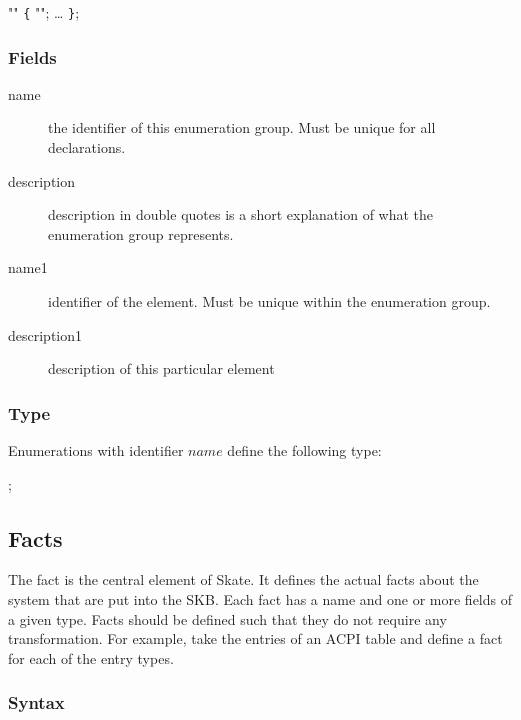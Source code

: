 \documentclass[a4paper,11pt,twoside]{report}
\begin{document}
{{\begin{syntax}
  "" \verb+{+
     "";
    \ldots
\verb+}+;
\end{syntax}

\subsubsection{Fields}

\begin{description}
    \item[name] the identifier of this enumeration group. Must be unique for 
                all declarations.
    
    \item [description] description in double quotes is a short explanation of
                        what the enumeration group represents.
    
    \item [name1] identifier of the element. Must be unique within the 
                  enumeration group.   
    
    \item [description1] description of this particular element
    
\end{description}

\subsubsection{Type}
Enumerations with identifier $name$ define the following type:
\begin{syntax}
 ;
\end{syntax}

\subsection{Facts}
\label{sec:decl:facts}

The fact is the central element of Skate. It defines the actual facts about the
system that are put into the SKB. Each fact has a name and one or more fields
of a given type. Facts should be defined such that they do not require any 
transformation. For example, take the entries of an ACPI table and define a
fact for each of the entry types. 

\subsubsection{Syntax}

}}
\end{document}
